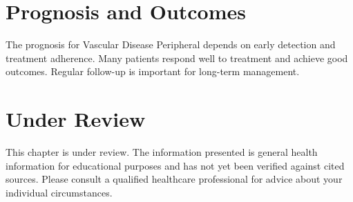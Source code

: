 \section*{Prognosis and Outcomes}
The prognosis for Vascular Disease Peripheral depends on early detection and treatment adherence. Many patients respond well to treatment and achieve good outcomes. Regular follow-up is important for long-term management.
\section*{Under Review}
This chapter is under review. The information presented is general health information for educational purposes and has not yet been verified against cited sources. Please consult a qualified healthcare professional for advice about your individual circumstances.


\clearpage
